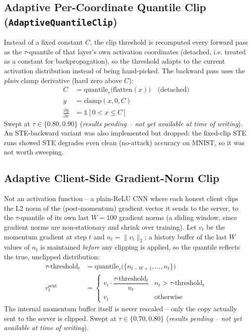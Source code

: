 \documentclass{article}
\begin{document}
\subsection{Adaptive Per-Coordinate Quantile Clip (\texttt{AdaptiveQuantileClip})}
Instead of a fixed constant $C$, the clip threshold is recomputed every forward pass as
the $\tau$-quantile of that layer's own activation coordinates (detached, i.e. treated
as a constant for backpropagation), so the threshold adapts to the current activation
distribution instead of being hand-picked. The backward pass uses the \emph{plain} clamp
derivative (hard zero above $C$):
\begin{align*}
    C &= \mathrm{quantile}_\tau\big(\mathrm{flatten}(x)\big) \quad \text{(detached)} \\
    y &= \mathrm{clamp}(x, 0, C) \\
    \frac{\partial y}{\partial x} &= \mathbb{1}[0 < x \leq C]
\end{align*}
Swept at $\tau \in \{0.80, 0.90\}$
(\emph{results pending -- not yet available at time of writing}). An STE-backward variant
was also implemented but dropped: the fixed-clip STE runs showed STE degrades even clean
(no-attack) accuracy on MNIST, so it was not worth sweeping.

\subsection{Adaptive Client-Side Gradient-Norm Clip}
Not an activation function -- a plain-ReLU CNN where each honest client clips the L2
norm of the (post-momentum) gradient vector it sends to the server, to the
$\tau$-quantile of its own last $W=100$ gradient norms (a sliding window, since
gradient norms are non-stationary and shrink over training). Let $v_t$ be the momentum
gradient at step $t$ and $n_t = \lVert v_t \rVert_2$; a history buffer of the last $W$
values of $n_t$ is maintained \emph{before} any clipping is applied, so the quantile
reflects the true, unclipped distribution:
\begin{align*}
    \tau\text{-threshold}_t &= \mathrm{quantile}_\tau\big(\{n_{t-W+1}, \dots, n_t\}\big) \\
    v_t^{\text{sent}} &=
    \begin{cases}
        v_t \cdot \dfrac{\tau\text{-threshold}_t}{n_t} & n_t > \tau\text{-threshold}_t \\
        v_t & \text{otherwise}
    \end{cases}
\end{align*}
The internal momentum buffer itself is never rescaled -- only the copy actually sent to
the server is clipped. Swept at $\tau \in \{0.70, 0.80\}$
(\emph{results pending -- not yet available at time of writing}).
\end{document}
